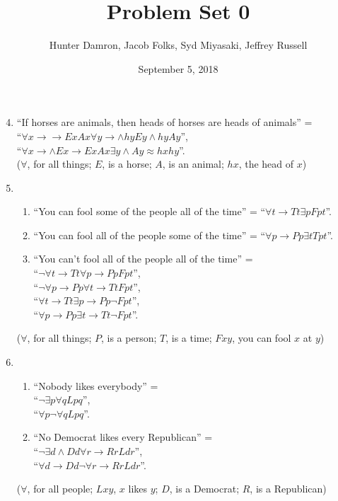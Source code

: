 \documentclass{homework}
\title{Problem Set 0}
\author{Hunter Damron, Jacob Folks, Syd Miyasaki, Jeffrey Russell}
\date{September 5, 2018}
\begin{document}
	\maketitle
	\begin{enumerate}
		\setcounter{enumi}{3}
		\item ``If horses are animals, then heads of horses are heads of animals'' = \\
		``$\forall x \rightarrow \rightarrow E x A x \forall y \rightarrow \land h y E y \land h y A y$'', \\
		``$\forall x \rightarrow \land E x \rightarrow E x A x \exists y \land A y \approx hx h y$''. \\
		($\forall$, for all things; $E$, is a horse; $A$, is an animal; $hx$, the head of $x$)
		\item 
		\begin{enumerate}
			\item ``You can fool some of the people all of the time'' = ``$\forall t \rightarrow T t \exists p F p t$''.
			\item ``You can fool all of the people some of the time'' = ``$\forall p \rightarrow P p \exists t T p t$''.
			\item ``You can’t fool all of the people all of the time'' = \\
			``$\lnot \forall t \rightarrow T t \forall p \rightarrow P p F p t$'', \\
			``$\lnot \forall p \rightarrow P p \forall t \rightarrow T t F p t$'', \\
			``$\forall t \rightarrow T t \exists p \rightarrow P p \lnot F p t$'', \\
			``$\forall p \rightarrow P p \exists t \rightarrow T t \lnot F p t$''.
		\end{enumerate}
		($\forall$, for all things; $P$, is a person; $T$, is a time; $Fxy$, you can fool $x$ at $y$)
		
		\setcounter{enumi}{6}		
		\item
		\begin{enumerate}
			\item ``Nobody likes everybody'' = \\
			``$\lnot \exists p \forall q L p q$'', \\
			``$\forall p \lnot \forall q L p q$''.
			\item ``No Democrat likes every Republican'' = \\
			``$\lnot \exists d \land D d \forall r \rightarrow R r L d r$'', \\
			``$\forall d \rightarrow D d \lnot \forall r \rightarrow R r L d r$''.
		\end{enumerate}
		($\forall$, for all people; $Lxy$, $x$ likes $y$; $D$, is a Democrat; $R$, is a Republican)
		

\end{enumerate}
\end{document}
